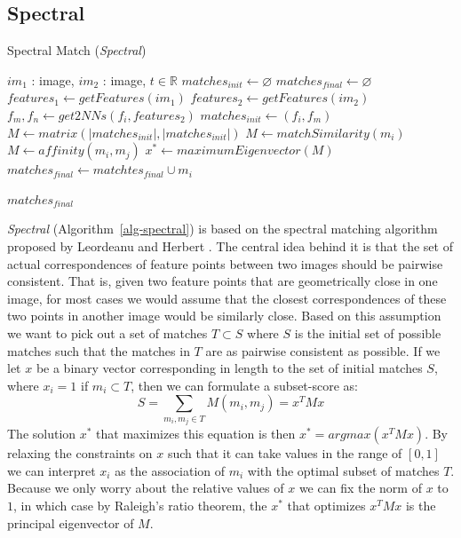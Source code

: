 \subsection{Spectral}

\begin{algorithm}[h]
\caption{Spectral Match (\emph{Spectral})}
\label{alg-spectral}
\begin{algorithmic}
\Require $im_1$ : image, $im_2$ : image, $t \in \mathbb{R}$
\State $matches_{init}\gets \varnothing$
\State $matches_{final} \gets \varnothing$
\State $features_1 \gets getFeatures(im_1)$
\State $features_2 \gets getFeatures(im_2)$
	\State $f_m,f_n \gets get2NNs(f_i, features_2)$
	\State $matches_{init} \gets \left(f_i, f_m\right)$
\EndFor
\State $M \gets matrix(\left\vert matches_{init} \right\vert, \left\vert 
matches_{init} \right\vert)$
			\State $M \gets matchSimilarity(m_i)$
		\Else
			\State $M \gets affinity(m_i, m_j)$
		\EndIf
	\EndFor
\EndFor
\State $x^{*} \gets maximumEigenvector(M)$
		\State $matches_{final} \gets matchtes_{final} \cup m_i$
	\EndIf
\EndFor

\Return $matches_{final}$
\end{algorithmic}
\end{algorithm}

\emph{Spectral} (Algorithm~\ref{alg-spectral}) is based on the spectral 
matching algorithm proposed by Leordeanu and Herbert 
\cite{leordeanu2005spectral}.  The central idea behind it is that the 
set of actual correspondences of feature points between two images 
should be pairwise consistent. That is, given two feature points that 
are geometrically close in one image, for most cases we would assume 
that the closest correspondences of these two points in another image 
would be similarly close.  Based on this assumption we want to pick out 
a set of matches $T \subset S$ where $S$ is the initial set of possible 
matches such that the matches in $T$ are as pairwise consistent as 
possible. If we let $x$ be a binary vector corresponding in length to 
the set of initial matches $S$, where $x_i = 1$ if $m_i \subset T$, then 
we can formulate a subset-score as:
\begin{equation*}
	S = \sum_{m_i, m_j \in T} M(m_i, m_j) = x^TMx
\end{equation*}
The solution $x^{*}$ that maximizes this equation is then $x^{*} = 
argmax(x^TMx)$. By relaxing the constraints on $x$ such that it can take
values in the range of $\left[0, 1\right]$ we can interpret $x_i$ as the
association of $m_i$ with the optimal subset of matches $T$. Because we 
only worry about the relative values of $x$ we can fix the norm of $x$ 
to $1$, in which case by Raleigh's ratio theorem, the $x^{*}$ that 
optimizes $x^TMx$ is the principal eigenvector of $M$.

